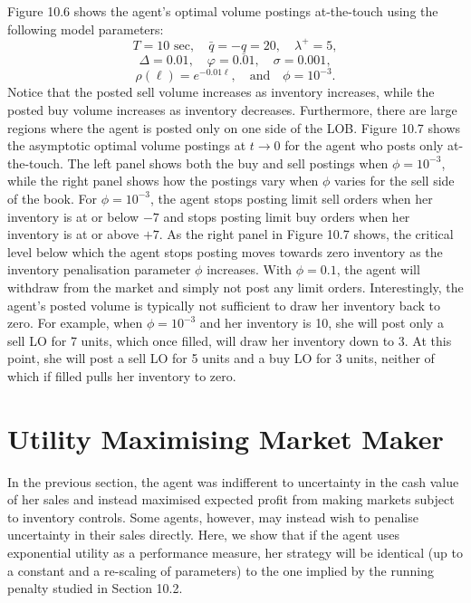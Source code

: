 \documentclass[11pt, a4paper]{book}
\begin{document}
	Figure 10.6 shows the agent's optimal volume postings at-the-touch using the following model parameters:
	\[
	T = 10 \text{ sec}, \quad \bar{q} = -\underline{q} = 20, \quad \lambda^+ = 5,
	\]
	\[
	\Delta = 0.01, \quad \varphi = 0.01, \quad \sigma = 0.001,
	\]
	\[
	\rho(\ell) = e^{-0.01 \ell}, \quad \text{and} \quad \phi = 10^{-3}.
	\]
	Notice that the posted sell volume increases as inventory increases, while the posted buy volume increases as inventory decreases. Furthermore, there are large regions where the agent is posted only on one side of the LOB. Figure 10.7 shows the asymptotic optimal volume postings at $t \to 0$ for the agent who posts only at-the-touch. The left panel shows both the buy and sell postings when $\phi = 10^{-3}$, while the right panel shows how the postings vary when $\phi$ varies for the sell side of the book. For $\phi = 10^{-3}$, the agent stops posting limit sell orders when her inventory is at or below $-7$ and stops posting limit buy orders when her inventory is at or above $+7$. As the right panel in Figure 10.7 shows, the critical level below which the agent stops posting moves towards zero inventory as the inventory penalisation parameter $\phi$ increases. With $\phi = 0.1$, the agent will withdraw from the market and simply not post any limit orders.
	Interestingly, the agent's posted volume is typically not sufficient to draw her inventory back to zero. For example, when $\phi = 10^{-3}$ and her inventory is 10, she will post only a sell LO for 7 units, which once filled, will draw her inventory down to 3. At this point, she will post a sell LO for 5 units and a buy LO for 3 units, neither of which if filled pulls her inventory to zero.
	
	\section{Utility Maximising Market Maker}
	
	In the previous section, the agent was indifferent to uncertainty in the cash value of her sales and instead maximised expected profit from making markets subject to inventory controls. Some agents, however, may instead wish to penalise uncertainty in their sales directly. Here, we show that if the agent uses exponential utility as a performance measure, her strategy will be identical (up to a constant and a re-scaling of parameters) to the one implied by the running penalty studied in Section 10.2.
	
\end{document}
